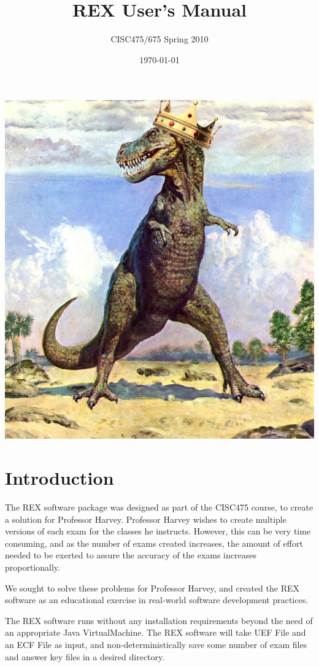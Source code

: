 \documentclass{article}
\author{CISC475/675 Spring 2010}
\title{REX User's Manual}
\date{\today}
\begin{document}
\maketitle
\begin{center}
\includegraphics{rex.png}
\end{center}

\newpage
\tableofcontents
\newpage

\section{Introduction}
The REX software package was designed as part of the CISC475 course,
to create a solution for Professor Harvey. Professor Harvey wishes to create
multiple versions of each exam for the classes he instructs. However,
this can be very time consuming, and as the number of exams created
increases, the amount of effort needed to be exerted to assure the
accuracy of the exams increases proportionally.

We sought to solve these problems for Professor Harvey, and created the
REX software as an educational exercise in real-world software
development practices.

The REX software runs without any installation requirements beyond the
need of an appropriate Java VirtualMachine. The REX software will take
UEF File and an ECF File as input, and non-deterministically save
some number of exam files and answer key files in a desired directory.
\end{document}
